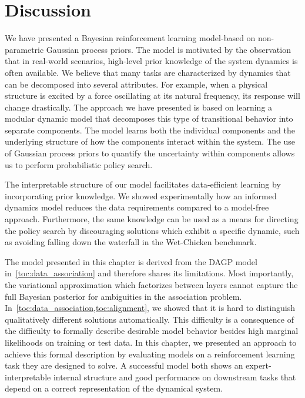 \section{Discussion}
\label{toc:interpretable_rl:conclusion}
We have presented a Bayesian reinforcement learning model-based on non-parametric Gaussian process priors.
The model is motivated by the observation that in real-world scenarios, high-level prior knowledge of the system dynamics is often available.
We believe that many tasks are characterized by dynamics that can be decomposed into several attributes.
For example, when a physical structure is excited by a force oscillating at its natural frequency, its response will change drastically.
The approach we have presented is based on learning a modular dynamic model that decomposes this type of transitional behavior into separate components.
The model learns both the individual components and the underlying structure of how the components interact within the system.
The use of Gaussian process priors to quantify the uncertainty within components allows us to perform probabilistic policy search.

The interpretable structure of our model facilitates data-efficient learning by incorporating prior knowledge.
We showed experimentally how an informed dynamics model reduces the data requirements compared to a model-free approach.
Furthermore, the same knowledge can be used as a means for directing the policy search by discouraging solutions which exhibit a specific dynamic, such as avoiding falling down the waterfall in the Wet-Chicken benchmark.

The model presented in this chapter is derived from the DAGP model in~\cref{toc:data_association} and therefore shares its limitations.
Most importantly, the variational approximation which factorizes between layers cannot capture the full Bayesian posterior for ambiguities in the association problem.
In~\cref{toc:data_association,toc:alignment}, we showed that it is hard to distinguish qualitatively different solutions automatically.
This difficulty is a consequence of the difficulty to formally describe desirable model behavior besides high marginal likelihoods on training or test data.
In this chapter, we presented an approach to achieve this formal description by evaluating models on a reinforcement learning task they are designed to solve.
A successful model both shows an expert-interpretable internal structure and good performance on downstream tasks that depend on a correct representation of the dynamical system.
